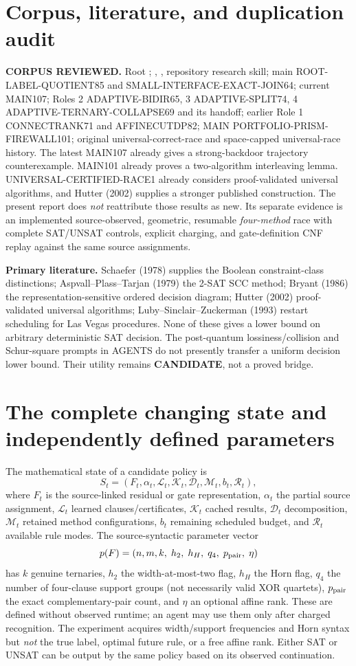 \documentclass[11pt]{article}
\begin{document}
\section{Corpus, literature, and duplication audit}
\textbf{CORPUS REVIEWED.} Root ; , , repository research skill; main ROOT-LABEL-QUOTIENT85 and SMALL-INTERFACE-EXACT-JOIN64; current MAIN107; Roles 2 ADAPTIVE-BIDIR65, 3 ADAPTIVE-SPLIT74, 4 ADAPTIVE-TERNARY-COLLAPSE69 and its handoff; earlier Role 1 CONNECTRANK71 and AFFINECUTDP82; MAIN PORTFOLIO-PRISM-FIREWALL101; original universal-correct-race and space-capped universal-race history. The latest MAIN107 already gives a strong-backdoor trajectory counterexample. MAIN101 already proves a two-algorithm interleaving lemma. UNIVERSAL-CERTIFIED-RACE1 already considers proof-validated universal algorithms, and Hutter (2002) supplies a stronger published construction. The present report does \emph{not} reattribute those results as new. Its separate evidence is an implemented source-observed, geometric, resumable \emph{four-method} race with complete SAT/UNSAT controls, explicit charging, and gate-definition CNF replay against the same source assignments.

\textbf{Primary literature.} Schaefer (1978) supplies the Boolean constraint-class distinctions; Aspvall--Plass--Tarjan (1979) the 2-SAT SCC method; Bryant (1986) the representation-sensitive ordered decision diagram; Hutter (2002) proof-validated universal algorithms; Luby--Sinclair--Zuckerman (1993) restart scheduling for Las Vegas procedures. None of these gives a lower bound on arbitrary deterministic SAT decision. The post-quantum lossiness/collision and Schur-square prompts in AGENTS do not presently transfer a uniform decision lower bound. Their utility remains \textbf{CANDIDATE}, not a proved bridge.

\section{The complete changing state and independently defined parameters}
The mathematical state of a candidate policy is
\[
S_t=(F_t,\alpha_t,\mathcal L_t,\mathcal K_t,
\mathcal D_t,\mathcal M_t,b_t,\mathcal R_t),
\]
where $F_t$ is the source-linked residual or gate representation, $\alpha_t$ the partial source assignment, $\mathcal L_t$ learned clauses/certificates, $\mathcal K_t$ cached results, $\mathcal D_t$ decomposition, $\mathcal M_t$ retained method configurations, $b_t$ remaining scheduled budget, and $\mathcal R_t$ available rule modes. The source-syntactic parameter vector
\[
p(F)=(n,m,k,\;h_2,\;h_H,\;q_4,\;p_{\rm pair},\;\eta)
\]
has $k$ genuine ternaries, $h_2$ the width-at-most-two flag, $h_H$ the Horn flag, $q_4$ the number of four-clause support groups (not necessarily valid XOR quartets), $p_{\rm pair}$ the exact complementary-pair count, and $\eta$ an optional affine rank. These are defined without observed runtime; an agent may use them only after charged recognition. The experiment acquires width/support frequencies and Horn syntax but \emph{not} the true label, optimal future rule, or a free affine rank. Either SAT or UNSAT can be output by the same policy based on its observed continuation.
\end{document}
